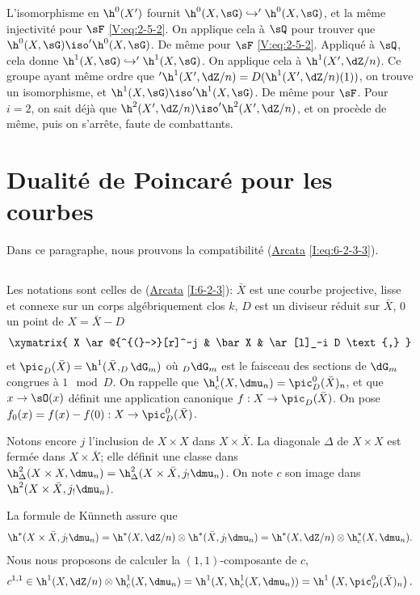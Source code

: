 L'isomorphisme en $\h^0(X')$ fournit $\h^0(X,\sG)\hookrightarrow '\h^0(X,\sG)$, 
et la même injectivité pour $\sF$ \eqref{V:eq:2-5-2}. On applique cela à $\sQ$ pour trouver que $\h^0(X,\sG) \iso '\h^0(X,\sG)$. De même pour $\sF$ \eqref{V:eq:2-5-2}. Appliqué à $\sQ$, 
cela donne $\h^1(X,\sG)\hookrightarrow '\h^1(X,\sG)$. On applique cela à 
$\h^1(X',\dZ/n)$. Ce groupe ayant même ordre que 
$'\h^1(X',\dZ/n)=D(\h^1(X',\dZ/n)(1))$, on trouve un isomorphisme, et 
$\h^1(X,\sG) \iso '\h^1(X,\sG)$. De même pour $\sF$. Pour $i=2$, on sait 
déjà que $\h^2(X',\dZ/n) \iso '\h^2(X',\dZ/n)$, et on procède de même, 
puis on s'arrête, faute de combattants. 










\section{Dualité de Poincaré pour les courbes}\label{V:3}

Dans ce paragraphe, nous prouvons la compatibilité (\hyperref[I]{Arcata}  
\ref{I:eq:6-2-3-3}). 





\subsection{}\label{V:3-1}

Les notations sont celles de (\hyperref[I]{Arcata} \ref{I:6-2-3}): $\bar X$ est 
une courbe projective, lisse et connexe sur un corps algébriquement clos $k$, 
$D$ est un diviseur réduit sur $\bar X$, $0$ un point de 
$X=\bar X-D$ 
\[\xymatrix{
  X \ar@{^{(}->}[r]^-j 
    & \bar X 
    & \ar[l]_-i D \text{,}
}\]
et $\pic_D(\bar X)=\h^1(\bar X,_D\dG_m)$ où $_D\dG_m$ est le faisceau des 
sections de $\dG_m$ congrues à $1\mod D$. On rappelle que 
$\h_c^1(X,\dmu_n) = \pic_D^0(\bar X)_n$, et que $x\to \sO(x)$ définit une 
application canonique $f:X\to \pic_D(\bar X)$. On pose 
$f_0(x)=f(x)-f(0):X\to \pic_D^0(\bar X)$.

Notons encore $j$ l'inclusion de $X\times X$ dans $X\times \bar X$. La 
diagonale $\Delta$ de $X\times X$ est fermée dans $X\times \bar X$; elle 
définit une classe dans 
$\h_\Delta^2(X\times X,\dmu_n)=\h_\Delta^2(X\times \bar X,j_!\dmu_n)$. On note 
$c$ son image dans $\h^2(X\times \bar X,j_!\dmu_n)$. 

La formule de K\"unneth assure que 
\[
  \h^*(X\times \bar X,j_!\dmu_n) = \h^*(X,\dZ/n)\otimes \h^*(\bar X,j_!\dmu_n) = \h^*(X,\dZ/n)\otimes \h_c^*(X,\dmu_n) \text{.}
\]
Nous nous proposons de calculer la $(1,1)$-composante de $c$, 
\[
  c^{1,1} \in \h^1(X,\dZ/n)\otimes \h_c^1(X,\dmu_n) = \h^1(X,\h_c^1(X,\dmu_n)) = \h^1\left(X,\pic_D^0(\bar X)_n\right) \text{.}
\]


